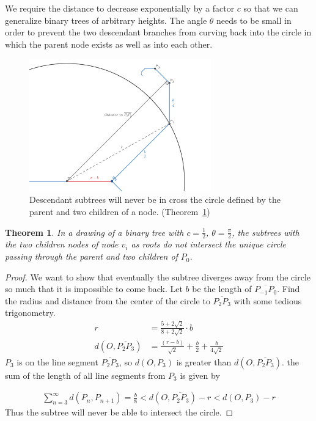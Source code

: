 \documentclass{NSF}
\newtheorem{theorem}{Theorem}[section]
\begin{document}
We require the distance to decrease exponentially by a factor $c$ so that we can generalize binary trees of arbitrary heights. The angle $\theta$ needs to be small in order to prevent the two descendant branches from curving back into the circle in which the parent node exists as well as into each other.

\begin{figure}[ht]
\centering
\includegraphics[width=0.7\textwidth]{images/proof-binary-tree.png}
\caption{Descendant subtrees will never be in cross the circle defined by the parent and two children of a node. (Theorem~\ref{thm:binary-tree-parent}) \label{fig:proof-binary-tree}}
\end{figure}

\begin{theorem}
In a drawing of a binary tree with $c=\frac{1}{2}$, $\theta=\frac{\pi}{2}$, the subtrees with the two children nodes of node $v_i$ as roots do not intersect the unique circle passing through the parent and two children of $P_0$.
\label{thm:binary-tree-parent}
\end{theorem}
\begin{proof}
We want to show that eventually the subtree diverges away from the circle so much that it is impossible to come back. Let $b$ be the length of $\overline{P_{-1}P_0}$. Find the radius and distance from the center of the circle to $\overline{P_{2}P_3}$ with some tedious trigonometry.
\begin{align*}
r &=\frac{5+2\sqrt{2}}{8+2\sqrt{2}} \cdot b \\
d(O,\overline{P_{2}P_3}) &= \frac{(r-b)}{\sqrt{2}}+\frac{b}{2}+\frac{b}{4\sqrt{2}}
\end{align*}
$P_3$ is on the line segment $\overline{P_{2}P_3}$, so $d(O,P_3)$ is greater than $d(O,\overline{P_{2}P_3})$. the sum of the length of all line segments from $P_3$ is given by

\begin{align*}
\sum_{n=3}^{\infty} d(P_n,P_{n+1}) = \frac{b}{8} < d(O,\overline{P_{2}P_3}) - r < d(O,P_3) - r
\end{align*}
Thus the subtree will never be able to intersect the circle.
\end{proof}
\end{document}
